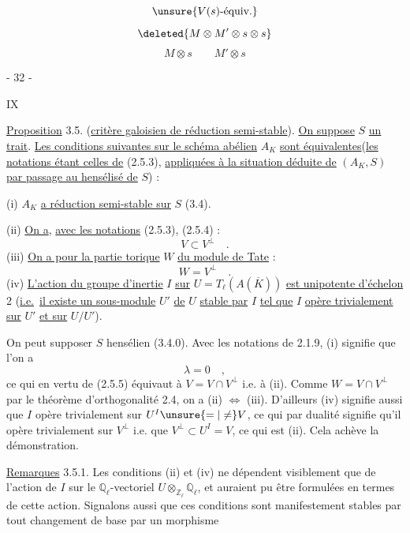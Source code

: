 \uline{}

\[
\unsure{V(s)\text{-équiv.}}
\]
\[
\deleted{M\otimes M'\otimes s\otimes s}
\]
\[
M\otimes s\qquad M'\otimes s
\]

\begin{center}- 32 -\end{center}\hfill IX

\uline{Proposition} 3.5. (\uline{critère galoisien de réduction semi-stable}). \uline{On suppose} $S$ \uline{un trait}. \uline{Les conditions suivantes sur le schéma abélien} $A_K$ \uline{sont équivalentes}\quad (\uline{les notations étant celles de} (2.5.3), \uline{appliquées à la situation déduite de} $(A_K,S)$ \uline{par passage au hensélisé de} $S$) :

(i) $A_K$ \uline{a réduction semi-stable sur} $S$ (3.4).

(ii) \uline{On a}, \uline{avec les notations} (2.5.3), (2.5.4) :
\[
V\subset V^\perp\quad.
\]
(iii) \uline{On a pour la partie torique} $W$ \uline{du module de Tate} :
\[
W=V^\perp\quad.
\]
(iv) \uline{L'action du groupe d'inertie} $I$ \uline{sur} $U=T_\ell(A(\overline K))$ \uline{est unipotente d'échelon} 2 (\uline{i.e.}\ \uline{il existe un sous-module} $U'$ \uline{de} $U$ \uline{stable par} $I$ \uline{tel que} $I$ \uline{opère trivialement sur} $U'$ \uline{et sur} $U/U'$).

On peut supposer $S$ hensélien (3.4.0). Avec les notations de 2.1.9, (i) signifie que l'on a
\[
\lambda=0\quad,
\]
ce qui en vertu de (2.5.5) équivaut à $V=V\cap V^\perp$ i.e. à (ii). Comme $W=V\cap V^\perp$ par le théorème d'orthogonalité 2.4, on a (ii) $\Longleftrightarrow$ (iii). D'ailleurs (iv) signifie aussi que $I$ opère trivialement sur $U^I\unsure{=|\ne}V$, ce qui par dualité signifie qu'il opère trivialement sur $V^\perp$ i.e. que $V^\perp\subset U^I=V$, ce qui est (ii). Cela achève la démonstration.

\uline{Remarques} 3.5.1. Les conditions (ii) et (iv) ne dépendent visiblement que de l'action de $I$ sur le $\mathbb Q_\ell$-vectoriel $U\otimes_{\mathbb Z_\ell}\mathbb Q_\ell$, et auraient pu être formulées en termes de cette action. Signalons aussi que ces conditions sont manifestement stables par tout changement de base par un morphisme

